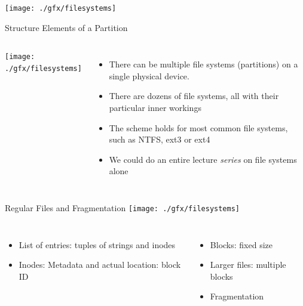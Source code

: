 
\begin{frame}
%
\begin{center}
	\texttt{[image: ./gfx/filesystems]}
\end{center}
%
\end{frame}


\begin{frame}{Structure Elements of a Partition}
%
\begin{columns}
	\texttt{[image: ./gfx/filesystems]}
%
	\small
	\begin{itemize}
	\item There can be multiple file systems (partitions) on a single physical device.
	\item There are dozens of file systems, all with their particular inner workings
	\item The scheme holds for most common file systems, such as NTFS, ext3 or ext4
	\item We could do an entire lecture \emph{series} on file systems alone
	\end{itemize}
\end{columns}
%
\end{frame}


\begin{frame}{Regular Files and Fragmentation}
%
\texttt{[image: ./gfx/filesystems]}
%
\begin{columns}
	\begin{itemize}
	\item List of entries: tuples of strings and inodes
	\item Inodes: Metadata and actual location: block ID
	\end{itemize}
%
	\begin{itemize}
	\item Blocks: fixed size
	\item Larger files: multiple blocks
	\item[\Thus] Fragmentation
	\end{itemize}
\end{columns}
%
\end{frame}

